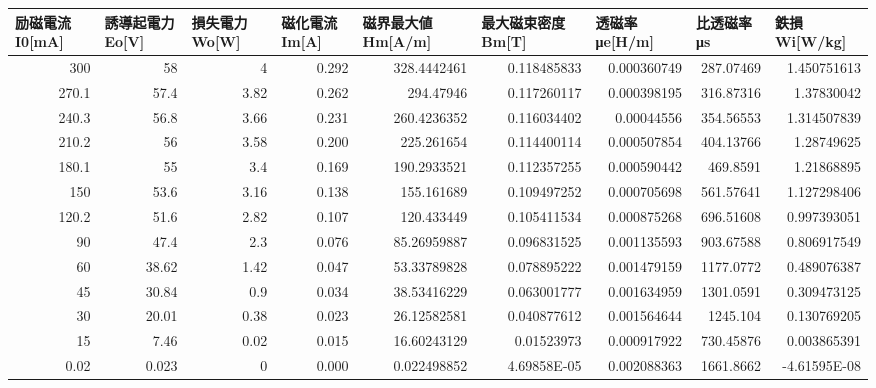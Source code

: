 \begin{tabular}{rrrrrrrrr}
\toprule
\multicolumn{1}{l}{励磁電流I0[mA]} & \multicolumn{1}{l}{誘導起電力Eo[V]} & \multicolumn{1}{l}{損失電力Wo[W]} & \multicolumn{1}{l}{磁化電流Im[A]} & \multicolumn{1}{l}{磁界最大値Hm[A/m]} & \multicolumn{1}{l}{最大磁束密度Bm[T]} & \multicolumn{1}{l}{透磁率μe[H/m]} & \multicolumn{1}{l}{比透磁率μs} & \multicolumn{1}{l}{鉄損Wi[W/kg]} \\
\midrule
300   & 58    & 4     & 0.292 & 328.4442461 & 0.118485833 & 0.000360749 & 287.07469 & 1.450751613 \\
270.1 & 57.4  & 3.82  & 0.262 & 294.47946 & 0.117260117 & 0.000398195 & 316.87316 & 1.37830042 \\
240.3 & 56.8  & 3.66  & 0.231 & 260.4236352 & 0.116034402 & 0.00044556 & 354.56553 & 1.314507839 \\
210.2 & 56    & 3.58  & 0.200 & 225.261654 & 0.114400114 & 0.000507854 & 404.13766 & 1.28749625 \\
180.1 & 55    & 3.4   & 0.169 & 190.2933521 & 0.112357255 & 0.000590442 & 469.8591 & 1.21868895 \\
150   & 53.6  & 3.16  & 0.138 & 155.161689 & 0.109497252 & 0.000705698 & 561.57641 & 1.127298406 \\
120.2 & 51.6  & 2.82  & 0.107 & 120.433449 & 0.105411534 & 0.000875268 & 696.51608 & 0.997393051 \\
90    & 47.4  & 2.3   & 0.076 & 85.26959887 & 0.096831525 & 0.001135593 & 903.67588 & 0.806917549 \\
60    & 38.62 & 1.42  & 0.047 & 53.33789828 & 0.078895222 & 0.001479159 & 1177.0772 & 0.489076387 \\
45    & 30.84 & 0.9   & 0.034 & 38.53416229 & 0.063001777 & 0.001634959 & 1301.0591 & 0.309473125 \\
30    & 20.01 & 0.38  & 0.023 & 26.12582581 & 0.040877612 & 0.001564644 & 1245.104 & 0.130769205 \\
15    & 7.46  & 0.02  & 0.015 & 16.60243129 & 0.01523973 & 0.000917922 & 730.45876 & 0.003865391 \\
0.02  & 0.023 & 0     & 0.000 & 0.022498852 & 4.69858E-05 & 0.002088363 & 1661.8662 & -4.61595E-08 \\
\bottomrule
\end{tabular}
